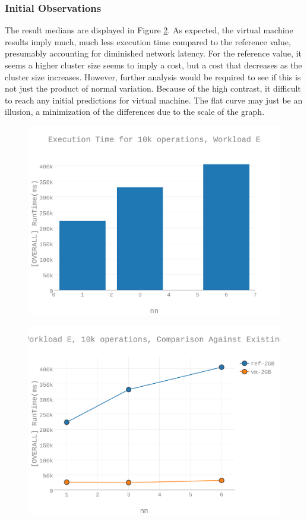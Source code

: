 \subsubsection{Initial Observations}
The result medians are displayed in Figure \ref{figures-wle_fig5}.  As expected, the virtual machine results imply much, much less execution time compared to the reference value, presumably accounting for diminished network latency. For the reference value, it seems a higher cluster size seems to imply a cost, but a cost that decreases as the cluster size increases. However,  further analysis would be required to see if this is not just the product of normal variation.  Because of the high contrast, it difficult to reach any initial predictions for virtual machine.  The flat curve may just be an illusion, a minimization of the differences due to the scale of the graph.  \begin{figure}[h]
\includegraphics[width=5.5in]{Figures/figures-wle_fig1.pdf}
\caption{}
\label{figures-wle_fig1}
\end{figure}

\begin{figure}[h]
\includegraphics[width=5.5in]{Figures/figures-wle_fig5.pdf}
\caption{}
\label{figures-wle_fig5}
\end{figure}



